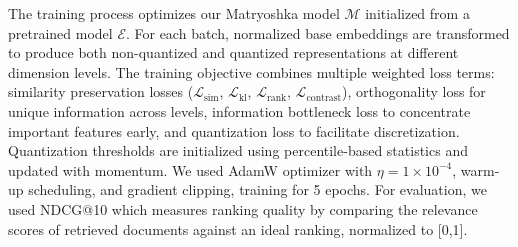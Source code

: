 The training process optimizes our Matryoshka model $\mathcal{M}$ initialized from a pretrained model $\mathcal{E}$. 
For each batch, normalized base embeddings are transformed to produce both non-quantized and quantized representations at different dimension levels. 
The training objective combines multiple weighted loss terms: similarity preservation losses ($\mathcal{L}_{\text{sim}}$, $\mathcal{L}_{\text{kl}}$, $\mathcal{L}_{\text{rank}}$, $\mathcal{L}_{\text{contrast}}$), orthogonality loss for unique information across levels, information bottleneck loss to concentrate important features early, and quantization loss to facilitate discretization. 
Quantization thresholds are initialized using percentile-based statistics and updated with momentum. We used AdamW \cite{loshchilov2018decoupled} optimizer with $\eta = 1 \times 10^{-4}$, warm-up scheduling, and gradient clipping, training for 5 epochs. 
For evaluation, we used NDCG@10 which measures ranking quality by comparing the relevance scores of retrieved documents against an ideal ranking, normalized to [0,1].
